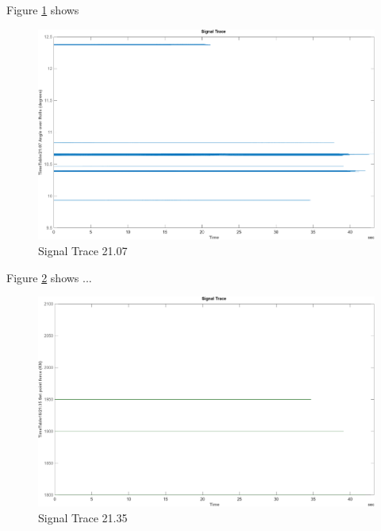 \documentclass{article}
\begin{document}
Figure \ref{fig:SignalTrace21.07} shows 
\begin{figure}[H]
    \centering
    \includegraphics[width=\textwidth, height=\textheight, keepaspectratio]{figures/SignalTrace21.07.png}
    \caption{Signal Trace 21.07}
    \label{fig:SignalTrace21.07}
\end{figure}

Figure \ref{fig:SignalTrace21.35} shows ...
\begin{figure}[H]
    \centering
    \includegraphics[width=\textwidth, height=\textheight, keepaspectratio]{figures/SignalTrace21.35.png}
    \caption{Signal Trace 21.35}
    \label{fig:SignalTrace21.35}
\end{figure}
\end{document}
